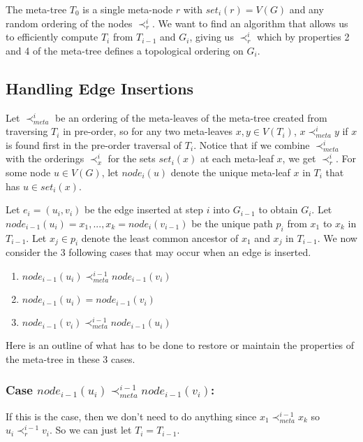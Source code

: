 \documentclass{article}
\begin{document}
The meta-tree $T_{0}$ is a single meta-node $r$ with $set_{i}(r)=V(G)$ and any random ordering of the nodes $\prec_{r}^{i}$. We want to find an algorithm that allows us to efficiently compute $T_{i}$ from $T_{i-1}$ and $G_{i}$, giving us $\prec_{r}^{i}$ which by properties 2 and 4 of the meta-tree defines a topological ordering on $G_{i}$.

\subsection{Handling Edge Insertions}

Let $\prec_{meta}^{i}$ be an ordering of the meta-leaves of the meta-tree created from traversing $T_{i}$ in pre-order, so for any two meta-leaves $x,y \in V(T_{i})$, $x \prec_{meta}^{i} y$ if $x$ is found first in the pre-order traversal of $T_{i}$. Notice that if we combine $\prec_{meta}^{i}$ with the orderings $\prec_{x}^{i}$ for the sets $set_{i}(x)$ at each meta-leaf $x$, we get $\prec_{r}^{i}$. For some node $u \in V(G)$, let $node_{i}(u)$ denote the unique meta-leaf $x$ in $T_{i}$ that has $u \in set_{i}(x)$.

Let $e_{i}=(u_{i},v_{i})$ be the edge inserted at step $i$ into $G_{i-1}$ to obtain $G_{i}$. Let $node_{i-1}(u_{i})=x_{1},...,x_{k}=node_{i}(v_{i-1})$ be the unique path $p_{i}$ from $x_{1}$ to $x_{k}$ in $T_{i-1}$. Let $x_{j}\in p_{i}$ denote the least common ancestor of $x_{1}$ and $x_{j}$ in $T_{i-1}$. We now consider the 3 following cases that may occur when an edge is inserted.

\begin{enumerate}
\item $node_{i-1}(u_{i}) \prec_{meta}^{i-1} node_{i-1}(v_{i})$
\item $node_{i-1}(u_{i}) = node_{i-1}(v_{i})$
\item $node_{i-1}(v_{i}) \prec_{meta}^{i-1} node_{i-1}(u_{i})$
\end{enumerate}

Here is an outline of what has to be done to restore or maintain the properties of the meta-tree in these 3 cases.

\subsubsection{Case $node_{i-1}(u_{i}) \prec_{meta}^{i-1} node_{i-1}(v_{i})$:}

If this is the case, then we don't need to do anything since $x_{1} \prec_{meta}^{i-1} x_{k}$ so $u_{i} \prec_{r}^{i-1} v_{i}$. So we can just let $T_{i}=T_{i-1}$.
\end{document}
